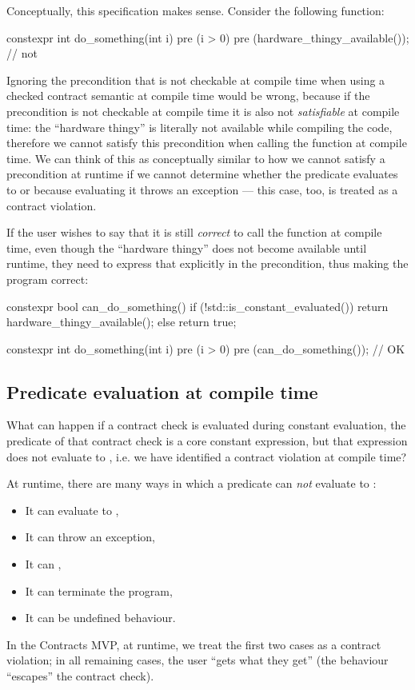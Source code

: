 Conceptually, this specification makes sense. Consider the following function:

\begin{codeblock}
constexpr int do_something(int i)
  pre (i > 0)
  pre (hardware_thingy_available());  // not 
\end{codeblock}

Ignoring the precondition that is not checkable at compile time when using a checked contract semantic at compile time would be wrong, because if the precondition is not checkable at compile time it is also not \emph{satisfiable} at compile time: the ``hardware thingy'' is literally not available while compiling the code, therefore we cannot satisfy this precondition when calling the function at compile time. We can think of this as conceptually similar to how we cannot satisfy a precondition at runtime if we cannot determine whether the predicate evaluates to  or  because evaluating it throws an exception --- this case, too, is treated as a contract violation.

If the user wishes to say that it is still \emph{correct} to call the function at compile time, even though the ``hardware thingy'' does not become available until runtime, they need to express that explicitly in the precondition, thus making the program correct:

\begin{codeblock}
constexpr bool can_do_something() {
  if (!std::is_constant_evaluated())
    return hardware_thingy_available();
  else
    return true;
}

constexpr int do_something(int i)
  pre (i > 0)
  pre (can_do_something());  // OK
\end{codeblock}

\subsection{Predicate evaluation at compile time}

What can happen if a contract check is evaluated during constant evaluation, the predicate of that contract check is a core constant expression, but that expression does not evaluate to , i.e. we have identified a contract violation at compile time?

At runtime, there are many ways in which a predicate can \emph{not} evaluate to :
\begin{itemize}
\item It can evaluate to ,
\item It can throw an exception,
\item It can ,
\item It can terminate the program,
\item It can be undefined behaviour.
\end{itemize}
In the Contracts MVP, at runtime, we treat the first two cases as a contract violation; in all remaining cases, the user ``gets what they get'' (the behaviour ``escapes'' the contract check).

